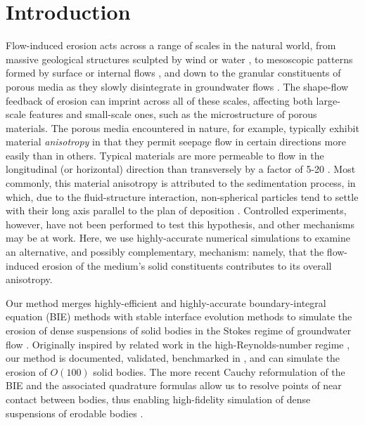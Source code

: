 \documentclass[3p]{elsarticle}
\begin{document}


\section{Introduction}

Flow-induced erosion acts across a range of scales in the natural world, from massive geological structures sculpted by wind or water \cite{abrams2009growth, perkins2015amplification, mac2020ultra, sharma2022alcove, mac2022morphological}, to mesoscopic patterns formed by surface or internal flows \cite{berhanu2012shape, bertagni2021hydrodynamic}, and down to the granular constituents of porous media as they slowly disintegrate in groundwater flows \cite{zareei2022temporal}. The shape-flow feedback of erosion can imprint across all of these scales, affecting both large-scale features and small-scale ones, such as the microstructure of porous materials.
The porous media encountered in nature, for example, typically exhibit material {\em anisotropy} in that they permit seepage flow in certain directions more easily than in others. Typical materials are more permeable to flow in the longitudinal (or horizontal) direction than transversely by a factor of 5-20 \cite{bear1988dynamics, anderson2015applied}. Most commonly, this material anisotropy is attributed to the sedimentation process, in which, due to the fluid-structure interaction, non-spherical particles tend to settle with their long axis parallel to the plan of deposition \cite{bear1988dynamics}. Controlled experiments, however, have not been performed to test this hypothesis, and other mechanisms may be at work. Here, we use highly-accurate numerical simulations to examine an alternative, and possibly complementary, mechanism: namely, that the flow-induced erosion of the medium's solid constituents contributes to its overall anisotropy.

Our method merges highly-efficient and highly-accurate boundary-integral equation (BIE) methods with stable interface evolution methods to simulate the erosion of dense suspensions of solid bodies in the Stokes regime of groundwater flow \cite{quaife2018boundary}. Originally inspired by related work in the high-Reynolds-number regime \cite{Ristroph2012, Moore2013, Huang2015, MooreCPAM2017}, our method is documented, validated, benchmarked in \cite{quaife2018boundary}, and can simulate the erosion of $O(100)$ solid bodies. The more recent Cauchy reformulation of the BIE and the associated  quadrature formulas allow us to resolve points of near contact between bodies, thus enabling high-fidelity simulation of dense suspensions of erodable bodies \cite{chiu2020viscous}.
\end{document}
